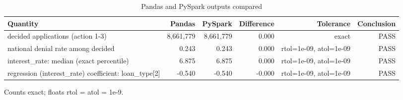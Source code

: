 \begin{table}[t]
\centering
\caption{Pandas and PySpark outputs compared}
\label{tab:table7_correctness}
\small
\begin{tabular}{lrrrrr}
\toprule
Quantity & Pandas & PySpark & Difference & Tolerance & Conclusion \\
\midrule
decided applications (action 1-3) & 8,661,779 & 8,661,779 & 0.000 & exact & PASS \\
national denial rate among decided & 0.243 & 0.243 & 0.000 & rtol=1e-09, atol=1e-09 & PASS \\
interest\_rate: median (exact percentile) & 6.875 & 6.875 & 0.000 & rtol=1e-09, atol=1e-09 & PASS \\
regression (interest\_rate) coefficient: loan\_type[2] & -0.540 & -0.540 & -0.000 & rtol=1e-09, atol=1e-09 & PASS \\
\bottomrule
\end{tabular}
\par\footnotesize Counts exact; floats rtol = atol = 1e-9.
\end{table}
